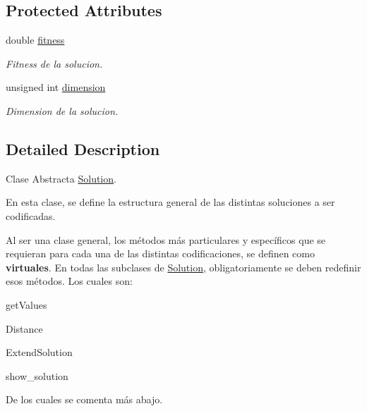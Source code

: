 \subsection*{Protected Attributes}
\begin{DoxyCompactItemize}
\item 
\hypertarget{class_solution_a215acc6c80b2c16071246b9ded8f32ab}{double \hyperlink{class_solution_a215acc6c80b2c16071246b9ded8f32ab}{fitness}}\label{class_solution_a215acc6c80b2c16071246b9ded8f32ab}

\begin{DoxyCompactList}\small\item\em Fitness de la solucion. \end{DoxyCompactList}\item 
\hypertarget{class_solution_a7111f2ad10bd9e1696d3e19c1b5bff09}{unsigned int \hyperlink{class_solution_a7111f2ad10bd9e1696d3e19c1b5bff09}{dimension}}\label{class_solution_a7111f2ad10bd9e1696d3e19c1b5bff09}

\begin{DoxyCompactList}\small\item\em Dimension de la solucion. \end{DoxyCompactList}\end{DoxyCompactItemize}


\subsection{Detailed Description}
Clase Abstracta \hyperlink{class_solution}{Solution}. 

En esta clase, se define la estructura general de las distintas soluciones a ser codificadas.

Al ser una clase general, los métodos más particulares y específicos que se requieran para cada una de las distintas codificaciones, se definen como {\bfseries virtuales}. En todas las subclases de \hyperlink{class_solution}{Solution}, obligatoriamente se deben redefinir esos métodos. Los cuales son\+:


\begin{DoxyItemize}
\item get\+Values 
\item Distance 
\item Extend\+Solution 
\item show\+\_\+solution 
\end{DoxyItemize}

De los cuales se comenta más abajo. 


